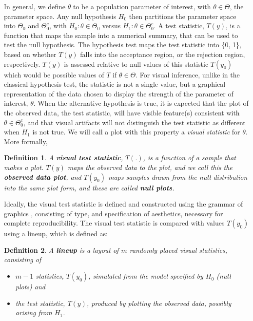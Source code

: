 \documentclass{article}
\newtheorem{dfn}{Definition}[section]
\begin{document}
In general, we define $\theta$ to be a population parameter of interest, with $\theta \in \Theta$, the parameter space. Any null hypothesis $H_0$ then partitions the parameter space into $\Theta_0$ and $\Theta_0^c$, with $H_0: \theta \in \Theta_0$ versus $H_1: \theta \in \Theta_0^c$. A test statistic, $T(y)$, is a function that maps the sample into a numerical summary, that can be used to test the null hypothesis. The hypothesis test maps the test statistic into \{0, 1\}, based on whether $T(y)$ falls into the acceptance region, or the rejection region, respectively. $T(y)$ is assessed relative to null values of this statistic $T(y_0)$ which would be possible values of $T$ if $\theta \in \Theta$.  %
For visual inference, unlike in the classical hypothesis test, the statistic is not a single value, but a graphical representation of the data chosen to display the strength of the parameter of interest, $\theta$. When the alternative hypothesis is true, it is expected that the plot of the observed data, the test statistic, will have visible feature(s) consistent with $\theta \in \Theta_0^c$, and that visual artifacts will not distinguish the test statistic as different when $H_1$ is not true. We will call a plot with this property a {\it visual statistic} for $\theta$. More formally, 

\begin{dfn} \label{dfn:test}
A \textbf{visual test statistic}, $T(.)$, is a function of a sample that makes a plot. $T(y)$ maps the observed data to the plot, and we call this the \textbf{observed data plot}, and $T(y_0)$ maps samples drawn from the null distribution into the same plot form, and these are called \textbf{null plots}. 
\end{dfn}

\noindent Ideally, the visual test statistic is defined and constructed using the grammar of graphics \citep{wilkinson:1999,hadley:2009}, consisting of type, and specification of aesthetics, necessary for complete reproducibility. The visual test statistic is compared with values $T(y_0)$ using a lineup, which is defined as:

\begin{dfn}\label{dfn:lplot}
A \textbf{lineup} is a layout of $m$ randomly placed visual statistics, consisting of 
\begin{itemize}\itemsep-3pt
\item $m-1$ statistics, $T(y_0)$, simulated from the model specified by $H_0$  (null plots) and 
\item the test statistic, $T(y)$, produced by plotting the observed data, possibly arising from $H_1$.
\end{itemize}
\end{dfn}
\end{document}
